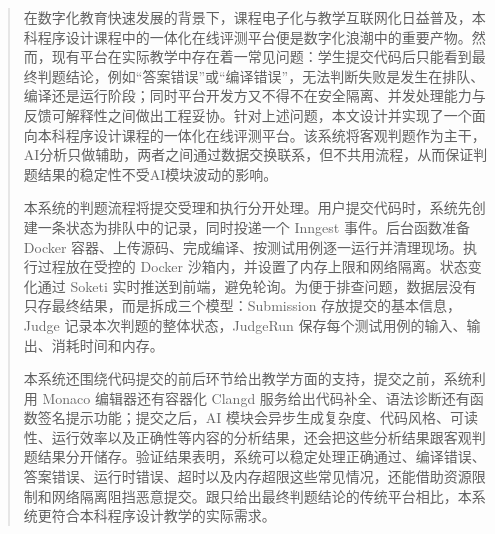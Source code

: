 \begin{abstract}

在数字化教育快速发展的背景下，课程电子化与教学互联网化日益普及，本科程序设计课程中的一体化在线评测平台便是数字化浪潮中的重要产物。然而，现有平台在实际教学中存在着一常见问题：学生提交代码后只能看到最终判题结论，例如“答案错误”或“编译错误”，无法判断失败是发生在排队、编译还是运行阶段；同时平台开发方又不得不在安全隔离、并发处理能力与反馈可解释性之间做出工程妥协。针对上述问题，本文设计并实现了一个面向本科程序设计课程的一体化在线评测平台。该系统将客观判题作为主干，AI分析只做辅助，两者之间通过数据交换联系，但不共用流程，从而保证判题结果的稳定性不受AI模块波动的影响。

本系统的判题流程将提交受理和执行分开处理。用户提交代码时，系统先创建一条状态为排队中的记录，同时投递一个 Inngest 事件。后台函数准备 Docker 容器、上传源码、完成编译、按测试用例逐一运行并清理现场。执行过程放在受控的 Docker 沙箱内，并设置了内存上限和网络隔离。状态变化通过 Soketi 实时推送到前端，避免轮询。为便于排查问题，数据层没有只存最终结果，而是拆成三个模型：Submission 存放提交的基本信息，Judge 记录本次判题的整体状态，JudgeRun 保存每个测试用例的输入、输出、消耗时间和内存。

本系统还围绕代码提交的前后环节给出教学方面的支持，提交之前，系统利用 Monaco 编辑器还有容器化 Clangd 服务给出代码补全、语法诊断还有函数签名提示功能；提交之后，AI 模块会异步生成复杂度、代码风格、可读性、运行效率以及正确性等内容的分析结果，还会把这些分析结果跟客观判题结果分开储存。验证结果表明，系统可以稳定处理正确通过、编译错误、答案错误、运行时错误、超时以及内存超限这些常见情况，还能借助资源限制和网络隔离阻挡恶意提交。跟只给出最终判题结论的传统平台相比，本系统更符合本科程序设计教学的实际需求。

\end{abstract}

